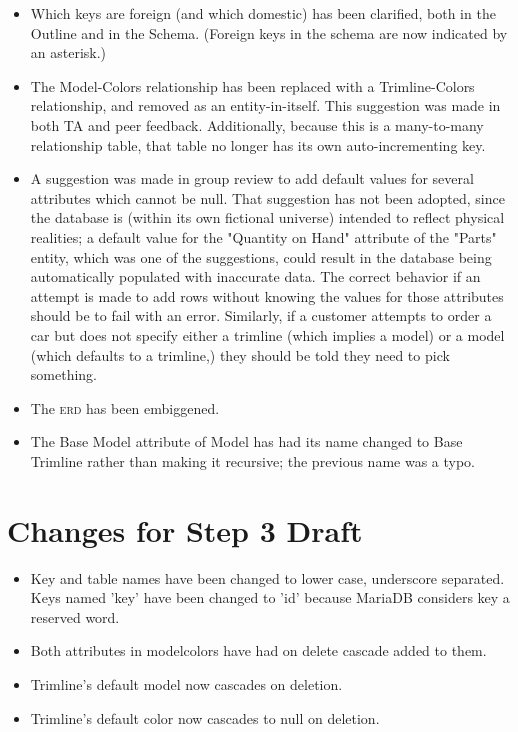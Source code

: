 \documentclass[11pt,letterpaper,oneside]{amsart}
\begin{document}
\begin{itemize}

\item Which keys are foreign (and which domestic) has been clarified, both in the Outline and in the Schema.  (Foreign keys in the schema are now indicated by an asterisk.)

\item The Model-Colors relationship has been replaced with a Trimline-Colors relationship, and removed as an entity-in-itself.  This suggestion was made in both TA and peer feedback.  Additionally, because this is a many-to-many relationship table, that table no longer has its own auto-incrementing key.

\item A suggestion was made in group review to add default values for several attributes which cannot be null.  That suggestion has not been adopted, since the database is (within its own fictional universe) intended to reflect physical realities; a default value for the "Quantity on Hand" attribute of the "Parts" entity, which was one of the suggestions, could result in the database being automatically populated with inaccurate data.  The correct behavior if an attempt is made to add rows without knowing the values for those attributes should be to fail with an error.  Similarly, if a customer attempts to order a car but does not specify either a trimline (which implies a model) or a model (which defaults to a trimline,) they should be told they need to pick something.

\item The \textsc{erd} has been embiggened.

\item The Base Model attribute of Model has had its name changed to Base Trimline rather than making it recursive; the previous name was a typo.

\end{itemize}

\section*{Changes for Step 3 Draft}

\begin{itemize}

\item Key and table names have been changed to lower case, underscore separated.  Keys named 'key' have been changed to 'id' because MariaDB considers key a reserved word.

\item Both attributes in model{\textunderscore}colors have had on delete cascade added to them.

\item Trimline's default model now cascades on deletion.

\item Trimline's default color now cascades to null on deletion.

\end{itemize}
\end{document}

